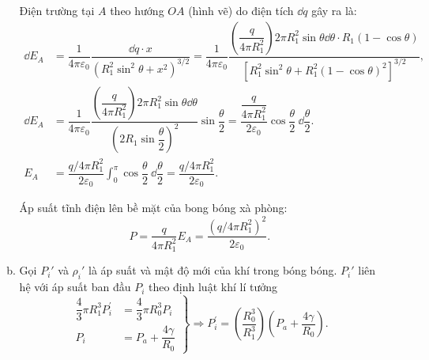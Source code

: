 \begin{loigiai}
\begin{enumerate}[1)]
\begin{enumerate}[a)]
\begin{center}
\begin{tikzpicture}[x=0.75pt,y=0.75pt,yscale=-1,xscale=1]
                \end{tikzpicture}
            \end{center}
            Điện trường tại $A$ theo hướng $OA$ (hình vẽ) do điện tích $\dd q$ gây ra là:
            \[\begin{aligned}
                \dd{{E}_{A}} &= \dfrac{1}{4\pi {{\varepsilon }_{0}}}\dfrac{\dd q\cdot x}{{{\left( R_{1}^{2}{{\sin }^{2}}\theta +{{x}^{2}} \right)}^{3/2}}}=\dfrac{1}{4\pi {{\varepsilon }_{0}}}\dfrac{\left( \dfrac{q}{4\pi R_{1}^{2}} \right)2\pi R_{1}^{2}\sin \theta \dd \theta \cdot {{R}_{1}}(1-\cos \theta )}{{{\left[ R_{1}^{2}{{\sin }^{2}}\theta +R_{1}^{2}{{(1-\cos \theta )}^{2}} \right]}^{3/2}}},\\
                \dd{{E}_{A}} &= \dfrac{1}{4\pi {{\varepsilon }_{0}}}\dfrac{\left( \dfrac{q}{4\pi R_{1}^{2}} \right)2\pi R_{1}^{2}\sin \theta \dd \theta }{{{\left( 2{{R}_{1}}\sin \dfrac{\theta }{2} \right)}^{2}}}\sin \dfrac{\theta }{2}=\dfrac{\dfrac{q}{4\pi R_{1}^{2}}}{2{{\varepsilon }_{0}}}\cos \dfrac{\theta }{2}~\dd\dfrac{\theta }{2}.\\
                {{E}_{A}} &= \dfrac{q/4\pi R_{1}^{2}}{2{{\varepsilon }_{0}}}\int_{0}^{\pi }{\cos }\dfrac{\theta }{2}~\dd\dfrac{\theta }{2}=\dfrac{q/4\pi R_{1}^{2}}{2{{\varepsilon }_{0}}}.
            \end{aligned}\]
            
            Áp suất tĩnh điện lên bề mặt của bong bóng xà phòng: 
            $$P=\dfrac{q}{4\pi R_{1}^{2}}{{E}_{A}}=\dfrac{{{\left( q/4\pi R_{1}^{2} \right)}^{2}}}{2{{\varepsilon }_{0}}}.$$
            \item Gọi $P_{i}'$ và $\rho_{i}'$ là áp suất và mật độ mới của khí trong bóng bóng. $P_{i}'$ liên hệ với áp suất ban đầu ${{P}_{i}}$ theo định luật khí lí tưởng
            \[\left. \begin{aligned}
            \dfrac{4}{3}\pi R_1^3P_i^\prime  &= \dfrac{4}{3}\pi R_0^3{P_i} \\
             {P_i} &= {P_a} + \dfrac{{4\gamma }}{{{R_0}}}
            \end{aligned}  \right\} \Rightarrow P_i^\prime  = \left( {\dfrac{{R_0^3}}{{R_1^3}}} \right)\left( {{P_a} + \dfrac{{4\gamma }}{{{R_0}}}} \right). \label{tft19.1.1}\tag{1}\]
            

\end{enumerate}
\end{enumerate}
\end{loigiai}
